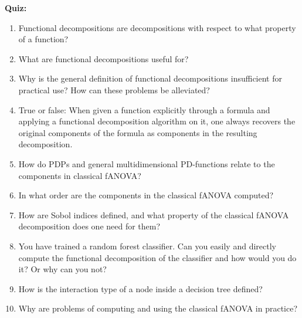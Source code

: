 \textbf{Quiz:}
\begin{enumerate}

    \item 
    Functional decompositions are decompositions with respect to what property of a function?
    \item 
    What are functional decompositions useful for?
    \item 
    Why is the general definition of functional decompositions insufficient for practical use? How can these problems be alleviated?
    \item 
    True or false: When given a function explicitly through a formula and applying a functional decomposition algorithm on it, one always recovers the original components of the formula as components in the resulting decomposition.
    \item 
    How do PDPs and general multidimensional PD-functions relate to the components in classical fANOVA?
    \item 
    In what order are the components in the classical fANOVA computed?
    \item 
    How are Sobol indices defined, and what property of the classical fANOVA decomposition does one need for them?
    \item
    You have trained a random forest classifier. Can you easily and directly compute the functional decomposition of the classifier and how would you do it? Or why can you not?
    \item 
    How is the interaction type of a node inside a decision tree defined?
    \item 
    Why are problems of computing and using the classical fANOVA in practice?

\end{enumerate}
